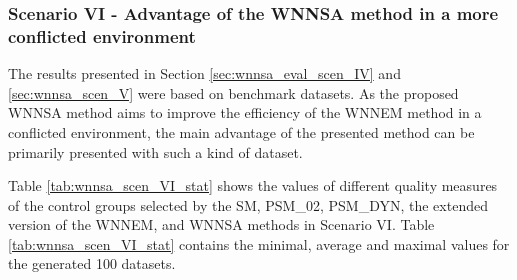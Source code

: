 		    
		\subsubsection{Scenario VI - Advantage of the WNNSA method in a more conflicted environment}
		\label{sec:wnnsa_scen_VI}
						
		The results presented in Section \ref{sec:wnnsa_eval_scen_IV} and \ref{sec:wnnsa_scen_V} were based on benchmark datasets. As the proposed WNNSA method aims to improve the efficiency of the WNNEM method in a conflicted environment, the main advantage of the presented method can be primarily presented with such a kind of dataset. %
								
		Table \ref{tab:wnnsa_scen_VI_stat} shows the values of different quality measures of the control groups selected by the SM, PSM\_02, PSM\_DYN, the extended version of the WNNEM, and WNNSA methods in Scenario VI. Table \ref{tab:wnnsa_scen_VI_stat} contains the minimal, average and maximal values for the generated 100 datasets.
								
